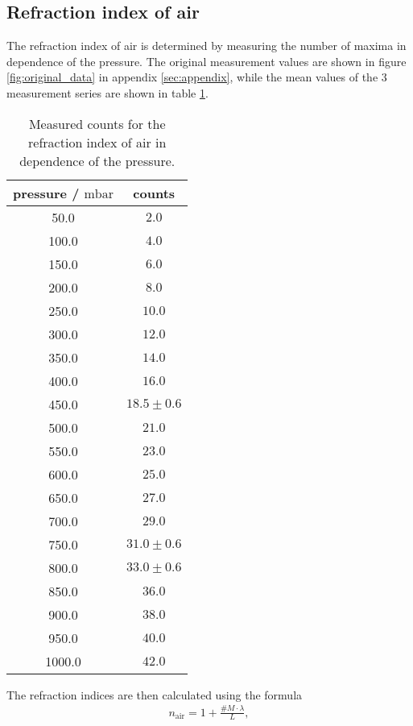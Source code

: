 \subsection{Refraction index of air}
\label{subsec:refraction_air}

The refraction index of air is determined by measuring the number of maxima in dependence of the pressure.
The original measurement values are shown in figure \ref{fig:original_data} in appendix \ref{sec:appendix}, while the mean values of the 3 measurement series are shown in table \ref{tab:refraction_air}.
\begin{table}[H]
    \centering
    \begin{tabular}{c c}
        \toprule
        pressure / $\si{\milli\bar}$  & counts \\    
        \midrule
        50.0 & $2.0$\\
        100.0 & $4.0$\\
        150.0 & $6.0$\\
        200.0 & $8.0$\\
        250.0 & $10.0$\\
        300.0 & $12.0$\\
        350.0 & $14.0$\\
        400.0 & $16.0$\\
        450.0 & $18.5\pm0.6$\\
        500.0 & $21.0$\\
        550.0 & $23.0$\\
        600.0 & $25.0$\\
        650.0 & $27.0$\\
        700.0 & $29.0$\\
        750.0 & $31.0\pm0.6$\\
        800.0 & $33.0\pm0.6$\\
        850.0 & $36.0$\\
        900.0 & $38.0$\\
        950.0 & $40.0$\\
        1000.0 & $42.0$\\
    \end{tabular}
    \caption{Measured counts for the refraction index of air in dependence of the pressure.}
    \label{tab:refraction_air}
\end{table}
\noindent
The refraction indices are then calculated using the formula
\begin{align}
    n_{\text{air}} = 1 + \frac{\#M\cdot\lambda}{L},
\end{align}
